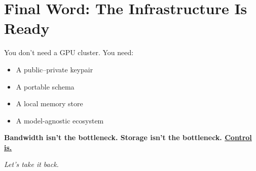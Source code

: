 \documentclass[11pt]{article}
\begin{document}
\section{Final Word: The Infrastructure Is Ready}
You don’t need a GPU cluster. You need:
\begin{itemize}[nosep]
    \item A public–private keypair
    \item A portable schema
    \item A local memory store
    \item A model-agnostic ecosystem
\end{itemize}

\textbf{Bandwidth isn’t the bottleneck. Storage isn’t the bottleneck. \underline{Control is.}}

\vspace{1em}
\textit{Let’s take it back.}
\end{document}
